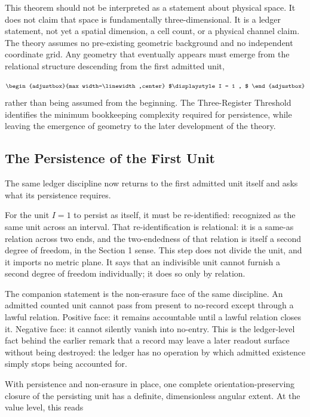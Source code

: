 This theorem should not be interpreted as a statement about physical space. It does not claim that space is fundamentally three-dimensional. It is a ledger statement, not yet a spatial dimension, a cell count, or a physical channel claim. The theory assumes no pre-existing geometric background and no independent coordinate grid. Any geometry that eventually appears must emerge from the relational structure descending from the first admitted unit,

\begin{equation*}
\begin{adjustbox}{max width=\linewidth,center}
$\displaystyle
I = 1 ,
$
\end{adjustbox}
\end{equation*}
rather than being assumed from the beginning. The Three-Register Threshold identifies the minimum bookkeeping complexity required for persistence, while leaving the emergence of geometry to the later development of the theory.

\subsection{The Persistence of the First Unit}
The same ledger discipline now returns to the first admitted unit itself and asks what its persistence requires.

For the unit \(I=1\) to persist as itself, it must be re-identified: recognized as the same unit across an interval. That re-identification is relational: it is a same-as relation across two ends, and the two-endedness of that relation is itself a second degree of freedom, in the Section 1 sense. This step does not divide the unit, and it imports no metric plane. It says that an indivisible unit cannot furnish a second degree of freedom individually; it does so only by relation.

The companion statement is the non-erasure face of the same discipline. An admitted counted unit cannot pass from present to no-record except through a lawful relation. Positive face: it remains accountable until a lawful relation closes it. Negative face: it cannot silently vanish into no-entry. This is the ledger-level fact behind the earlier remark that a record may leave a later readout surface without being destroyed: the ledger has no operation by which admitted existence simply stops being accounted for.

With persistence and non-erasure in place, one complete orientation-preserving closure of the persisting unit has a definite, dimensionless angular extent. At the value level, this reads


